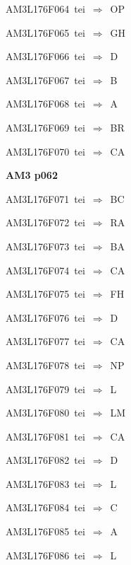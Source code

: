 {\sixrm AM3L176F064\ {\sixit tei}\ }$\Rightarrow$\ OP\par\smallskip
{\sixrm AM3L176F065\ {\sixit tei}\ }$\Rightarrow$\ GH\par\smallskip
{\sixrm AM3L176F066\ {\sixit tei}\ }$\Rightarrow$\ D\par\smallskip
{\sixrm AM3L176F067\ {\sixit tei}\ }$\Rightarrow$\ B\par\smallskip
{\sixrm AM3L176F068\ {\sixit tei}\ }$\Rightarrow$\ A\par\smallskip
{\sixrm AM3L176F069\ {\sixit tei}\ }$\Rightarrow$\ BR\par\smallskip
{\sixrm AM3L176F070\ {\sixit tei}\ }$\Rightarrow$\ CA\par\smallskip

\par\vfill\eject
{\bf\hfill AM3 p062\hfill\hbox{}}\par\bigskip
{\sixrm AM3L176F071\ {\sixit tei}\ }$\Rightarrow$\ BC\par\smallskip
{\sixrm AM3L176F072\ {\sixit tei}\ }$\Rightarrow$\ RA\par\smallskip
{\sixrm AM3L176F073\ {\sixit tei}\ }$\Rightarrow$\ BA\par\smallskip
{\sixrm AM3L176F074\ {\sixit tei}\ }$\Rightarrow$\ CA\par\smallskip
{\sixrm AM3L176F075\ {\sixit tei}\ }$\Rightarrow$\ FH\par\smallskip
{\sixrm AM3L176F076\ {\sixit tei}\ }$\Rightarrow$\ D\par\smallskip
{\sixrm AM3L176F077\ {\sixit tei}\ }$\Rightarrow$\ CA\par\smallskip
{\sixrm AM3L176F078\ {\sixit tei}\ }$\Rightarrow$\ NP\par\smallskip
{\sixrm AM3L176F079\ {\sixit tei}\ }$\Rightarrow$\ L\par\smallskip
{\sixrm AM3L176F080\ {\sixit tei}\ }$\Rightarrow$\ LM\par\smallskip
{\sixrm AM3L176F081\ {\sixit tei}\ }$\Rightarrow$\ CA\par\smallskip
{\sixrm AM3L176F082\ {\sixit tei}\ }$\Rightarrow$\ D\par\smallskip
{\sixrm AM3L176F083\ {\sixit tei}\ }$\Rightarrow$\ L\par\smallskip
{\sixrm AM3L176F084\ {\sixit tei}\ }$\Rightarrow$\ C\par\smallskip
{\sixrm AM3L176F085\ {\sixit tei}\ }$\Rightarrow$\ A\par\smallskip
{\sixrm AM3L176F086\ {\sixit tei}\ }$\Rightarrow$\ L\par\smallskip
